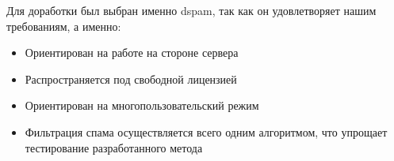 Для доработки был выбран именно dspam, так как он удовлетворяет нашим требованиям, а именно:
\begin{itemize}
\item Ориентирован на работе на стороне сервера
\item Распространяется под свободной лицензией
\item Ориентирован на многопользовательский режим
\item Фильтрация спама осуществляется  всего одним алгоритмом, что упрощает тестирование разработанного метода
\end{itemize}

